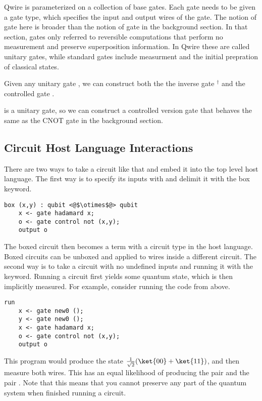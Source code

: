 Qwire is parameterized on a collection of base gates. 
Each gate needs to be given a gate type, which specifies the input and output wires of the gate. 
The notion of gate here is broader than the notion of gate in the background section. 
In that section, gates only referred to reversible computations that perform no measurement and preserve superposition information. 
In Qwire these are called unitary gates, while standard gates include measurment and the initial prepration of classical states. 

Given any unitary gate , we can construct both the the inverse gate $^\dagger$ and the controlled gate .

 is a unitary gate, so we can construct a controlled version  gate that behaves the same as the CNOT gate in the background section.

\subsection{Circuit Host Language Interactions}

There are two ways to take a circuit like that and embed it into the top level host language.
The first way is to specify its inputs with and delimit it with the box keyword.
\begin{lstlisting}[style=customcoq]
box (x,y) : qubit <@$\otimes$@> qubit
    x <- gate hadamard x;
    o <- gate control not (x,y);
    output o
\end{lstlisting}

The boxed circuit then becomes a term with a circuit type in the host language.
Boxed circuits can be unboxed and applied to wires inside a different circuit.
The second way is to take a circuit with no undefined inputs and running it with the \run keyword.
Running a circuit first yields some quantum state, which is then implicitly measured.
For example, consider running the code from above.
\begin{lstlisting}[style=customcoq]
run
    x <- gate new0 ();
    y <- gate new0 ();
    x <- gate hadamard x;
    o <- gate control not (x,y);
    output o
\end{lstlisting}
This program would produce the state $\frac{1}{\sqrt{2}}(\ket{00} + \ket{11})$, and then measure both wires.
This has an equal likelihood of producing the pair  and the pair .
Note that this means that you cannot preserve any part of the quantum system when finished running a circuit.

